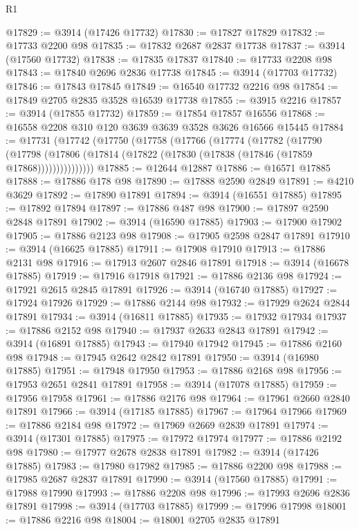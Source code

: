 \begin{lexlean}{R1}
\begin{coremodule}
@17829 := @3914 (@17426 @17732)
@17830 := @17827 @17829
@17832 := @17733 @2200 @98
@17835 := @17832 @2687 @2837 @17738
@17837 := @3914 (@17560 @17732)
@17838 := @17835 @17837
@17840 := @17733 @2208 @98
@17843 := @17840 @2696 @2836 @17738
@17845 := @3914 (@17703 @17732)
@17846 := @17843 @17845
@17849 := @16540 @17732 @2216 @98
@17854 := @17849 @2705 @2835 @3528 @16539 @17738
@17855 := @3915 @2216
@17857 := @3914 (@17855 @17732)
@17859 := @17854 @17857 @16556
@17868 := @16558 @2208 @310 @120 @3639 @3639 @3528 @3626 @16566 @15445
@17884 := @17731
    (@17742
      (@17750
        (@17758
          (@17766
            (@17774
              (@17782
                (@17790
                  (@17798
                    (@17806 (@17814 (@17822 (@17830 (@17838 (@17846 (@17859 @17868)))))))))))))))
@17885 := @12644 @12887
@17886 := @16571 @17885
@17888 := @17886 @178 @98
@17890 := @17888 @2590 @2849
@17891 := @4210 @3629
@17892 := @17890 @17891
@17894 := @3914 (@16551 @17885)
@17895 := @17892 @17894
@17897 := @17886 @487 @98
@17900 := @17897 @2590 @2848 @17891
@17902 := @3914 (@16590 @17885)
@17903 := @17900 @17902
@17905 := @17886 @2123 @98
@17908 := @17905 @2598 @2847 @17891
@17910 := @3914 (@16625 @17885)
@17911 := @17908 @17910
@17913 := @17886 @2131 @98
@17916 := @17913 @2607 @2846 @17891
@17918 := @3914 (@16678 @17885)
@17919 := @17916 @17918
@17921 := @17886 @2136 @98
@17924 := @17921 @2615 @2845 @17891
@17926 := @3914 (@16740 @17885)
@17927 := @17924 @17926
@17929 := @17886 @2144 @98
@17932 := @17929 @2624 @2844 @17891
@17934 := @3914 (@16811 @17885)
@17935 := @17932 @17934
@17937 := @17886 @2152 @98
@17940 := @17937 @2633 @2843 @17891
@17942 := @3914 (@16891 @17885)
@17943 := @17940 @17942
@17945 := @17886 @2160 @98
@17948 := @17945 @2642 @2842 @17891
@17950 := @3914 (@16980 @17885)
@17951 := @17948 @17950
@17953 := @17886 @2168 @98
@17956 := @17953 @2651 @2841 @17891
@17958 := @3914 (@17078 @17885)
@17959 := @17956 @17958
@17961 := @17886 @2176 @98
@17964 := @17961 @2660 @2840 @17891
@17966 := @3914 (@17185 @17885)
@17967 := @17964 @17966
@17969 := @17886 @2184 @98
@17972 := @17969 @2669 @2839 @17891
@17974 := @3914 (@17301 @17885)
@17975 := @17972 @17974
@17977 := @17886 @2192 @98
@17980 := @17977 @2678 @2838 @17891
@17982 := @3914 (@17426 @17885)
@17983 := @17980 @17982
@17985 := @17886 @2200 @98
@17988 := @17985 @2687 @2837 @17891
@17990 := @3914 (@17560 @17885)
@17991 := @17988 @17990
@17993 := @17886 @2208 @98
@17996 := @17993 @2696 @2836 @17891
@17998 := @3914 (@17703 @17885)
@17999 := @17996 @17998
@18001 := @17886 @2216 @98
@18004 := @18001 @2705 @2835 @17891

\end{coremodule}
\end{lexlean}
